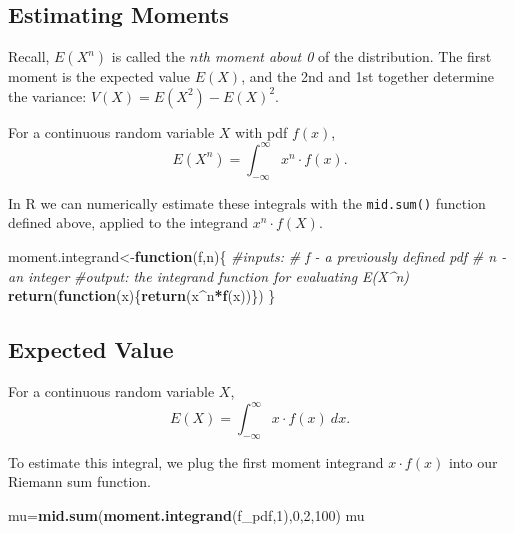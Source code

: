 \documentclass[
]{book}
\newenvironment{Shaded}{\begin{snugshade}}{\end{snugshade}}
\newcommand{\CommentTok}[1]{\textcolor[rgb]{0.56,0.35,0.01}{\textit{#1}}}
\newcommand{\ControlFlowTok}[1]{\textcolor[rgb]{0.13,0.29,0.53}{\textbf{#1}}}
\newcommand{\DecValTok}[1]{\textcolor[rgb]{0.00,0.00,0.81}{#1}}
\newcommand{\FunctionTok}[1]{\textcolor[rgb]{0.13,0.29,0.53}{\textbf{#1}}}
\newcommand{\NormalTok}[1]{#1}
\newcommand{\OtherTok}[1]{\textcolor[rgb]{0.56,0.35,0.01}{#1}}
\newcommand{\SpecialCharTok}[1]{\textcolor[rgb]{0.81,0.36,0.00}{\textbf{#1}}}
\theoremstyle{definition}
\theoremstyle{definition}
\theoremstyle{definition}
\theoremstyle{definition}
\theoremstyle{remark}
\begin{document}
\subsection{Estimating Moments}\label{estimating-moments}

Recall, \(E(X^n)\) is called the \emph{\(n\)th moment about 0} of the distribution. The first moment is the expected value \(E(X)\), and the 2nd and 1st together determine the variance: \(V(X) = E(X^2)-E(X)^2.\)

For a continuous random variable \(X\) with pdf \(f(x)\), \[E(X^n) = \int_{-\infty}^\infty x^n \cdot f(x).\]

In R we can numerically estimate these integrals with the \texttt{mid.sum()} function defined above, applied to the integrand \(x^n\cdot f(X)\).

\begin{Shaded}
\begin{Highlighting}[]
\NormalTok{moment.integrand}\OtherTok{\textless{}{-}}\ControlFlowTok{function}\NormalTok{(f,n)\{}
  \CommentTok{\#inputs:}
      \CommentTok{\# f {-} a previously defined pdf}
      \CommentTok{\# n {-} an integer}
  \CommentTok{\#output: the integrand function for evaluating E(X\^{}n)}
  \FunctionTok{return}\NormalTok{(}\ControlFlowTok{function}\NormalTok{(x)\{}\FunctionTok{return}\NormalTok{(x}\SpecialCharTok{\^{}}\NormalTok{n}\SpecialCharTok{*}\FunctionTok{f}\NormalTok{(x))\})}
\NormalTok{\}}
\end{Highlighting}
\end{Shaded}

\subsection{Expected Value}\label{expected-value-1}

For a continuous random variable \(X\), \[E(X)=\int_{-\infty}^{\infty} x \cdot f(x)~dx.\]

To estimate this integral, we plug the first moment integrand \(x \cdot f(x)\) into our Riemann sum function.

\begin{Shaded}
\begin{Highlighting}[]
\NormalTok{mu}\OtherTok{=}\FunctionTok{mid.sum}\NormalTok{(}\FunctionTok{moment.integrand}\NormalTok{(f\_pdf,}\DecValTok{1}\NormalTok{),}\DecValTok{0}\NormalTok{,}\DecValTok{2}\NormalTok{,}\DecValTok{100}\NormalTok{)}
\NormalTok{mu}
\end{Highlighting}
\end{Shaded}
\end{document}
